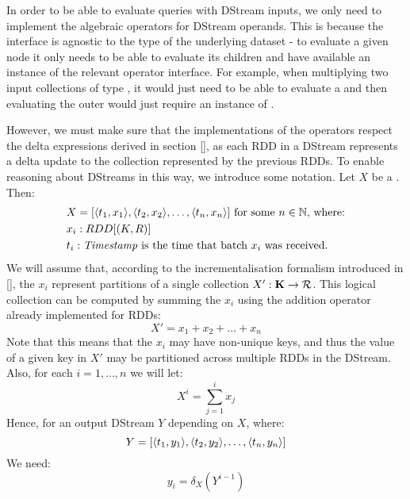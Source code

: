 In order to be able to evaluate queries with DStream inputs, we only need to implement the algebraic operators for DStream operands.  This is because the  interface is agnostic to the type of the underlying dataset - to evaluate a given node it only needs to be able to evaluate its children and have available an instance of the relevant operator interface. For example, when multiplying two input collections of type , it would just need to be able to evaluate a  and then evaluating the outer  would just require an instance of .

However, we must make sure that the implementations of the operators respect the delta expressions derived in section \ref{}, as each RDD in a DStream represents a delta update to the collection represented by the previous RDDs. To enable reasoning about DStreams in this way, we introduce some notation.
\vs
Let $X$ be a . Then:
\begin{equation*}
\begin{split}
&X = [\langle t_1, x_1 \rangle, \langle t_2, x_2 \rangle, \dots, \langle t_n, x_n \rangle] \textrm{ for some $n \in \mathbb{N}$, where:} \\
&x_i: RDD[(K,R)] \\
&t_i: \textrm{\textit{Timestamp}} \textrm{ is the time that batch $x_i$ was received.}
\end{split}
\end{equation*}
We will assume that, according to the incrementalisation formalism introduced in \ref{}, the $x_i$ represent partitions of a single collection $X': \mathbf{K} \rightarrow \mathcal{R}$. This logical collection can be computed by summing the $x_i$ using the addition operator already implemented for RDDs:
\begin{equation*}
X' = x_1 + x_2 + \dots + x_n
\end{equation*}
Note that this means that the $x_i$ may have non-unique keys, and thus the value of a given key in $X'$ may be partitioned across multiple RDDs in the DStream.
\vs
Also, for each $i = 1, \dots, n$ we will let:
\begin{equation*}
X^i = \sum_{j = 1}^i{x_j}
\end{equation*}
Hence, for an output DStream $Y$ depending on $X$, where:
\begin{equation*}
Y = [\langle t_1, y_1 \rangle, \langle t_2, y_2 \rangle, \dots, \langle t_n, y_n \rangle]
\end{equation*}
We need:
\begin{equation*}
y_i = \delta_X(Y^{i-1})
\end{equation*}

